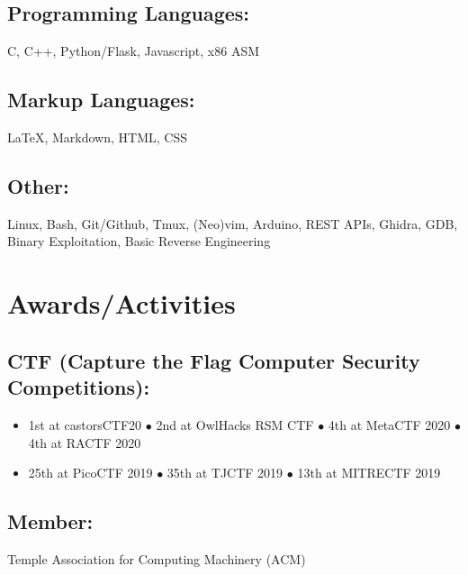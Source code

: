\documentclass{article}
\begin{document}
\subsection{Programming Languages:}
C, C++, Python/Flask, Javascript, x86 ASM
\subsection{Markup Languages:}
{\LaTeX}, Markdown, HTML, CSS
\subsection{Other:}
Linux, Bash, Git/Github, Tmux, (Neo)vim, Arduino, REST APIs, Ghidra, GDB, Binary Exploitation, Basic Reverse Engineering

\section{Awards/Activities}
\subsection{CTF (Capture the Flag Computer Security Competitions):}
\begin{itemize}
    \item 1st at castorsCTF20 $\bullet$ 2nd at OwlHacks RSM CTF $\bullet$ 4th at MetaCTF 2020 $\bullet$ 4th at RACTF 2020 
    \item 25th at PicoCTF 2019 $\bullet$ 35th at TJCTF 2019 $\bullet$ 13th at MITRECTF 2019 
\end{itemize} 
\subsection{Member: } Temple Association for Computing Machinery (ACM)
\end{document}
